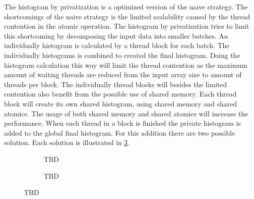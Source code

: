 
The histogram by privatization is a optimized version of the naive strategy. The shortcomings of the naive strategy is the limited scalability caused by the thread contention in the atomic operation. The histogram by privatization tries to limit this shortcoming by decomposing the input data into smaller batches. An individually histogram is calculated by a thread block for each batch. The individually histograms is combined to created the final histogram. Doing the histogram calculation this way will limit the thread contention as the maximum amount of waiting threads are reduced from the input array size to amount of threads per block.
The individually thread blocks will besides the limited contention also benefit from the possible use of shared memory. Each thread block will create its own shared histogram, using shared memory and shared atomics. The usage of both shared memory and shared atomics will increase the performance. When each thread in a block is finished the private histogram is added to the global final histogram. For this addition there are two possible solution. Each solution is illustrated in \cref{fig:hist_privat}. 

\begin{figure}[ht]
	\centering
	\begin{subfigure}{0.9\textwidth}
		\centering
		\caption{TBD}
		\label{fig:hist_privat_atomic}
	\end{subfigure}
	\begin{subfigure}{.9\textwidth}
		\centering
		\caption{TBD}
		\label{fig:hist_privat_reduce}
	\end{subfigure}
	\caption{TBD}
	\label{fig:hist_privat}
\end{figure} 

